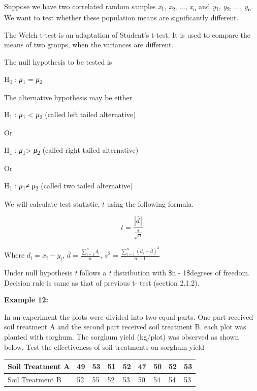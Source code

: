 \documentclass[
]{book}
\begin{document}
Suppose we have two correlated random samples \emph{x}\textsubscript{1}, \emph{x}\textsubscript{2}, ..., \emph{x}\textsubscript{n} and \emph{y}\textsubscript{1}, \emph{y}\textsubscript{2}, ..., \emph{y}\textsubscript{n}. We want to test whether these population means are significantly different.

The Welch t-test is an adaptation of Student's t-test. It is used to compare the means of two groups, when the variances are different.

The null hypothesis to be tested is

H\textsubscript{0} : \emph{μ}\textsubscript{1} = \emph{μ}\textsubscript{2}

The alternative hypothesis may be either

H\textsubscript{1} : \emph{μ}\textsubscript{1} \textless{} \emph{μ}\textsubscript{2} (called left tailed alternative)

Or

H\textsubscript{1} : \emph{μ}\textsubscript{1}\textgreater{} \emph{μ}\textsubscript{2} (called right tailed alternative)

Or

H\textsubscript{1} : \emph{μ}\textsubscript{1}≠ \emph{μ}\textsubscript{2} (called two tailed alternative)

We will calculate test statistic, \(t\) using the following formula.

\[t = \frac{|d^̅|}{\frac{s}{\sqrt{n}}}\]

Where \(d_{i} = x_{i} - y_{i}\), \(\overline{d} = \frac{\sum_{i = 1}^{n}d_{i}}{n}\), \(s^{2} = \frac{\sum_{i = 1}^{n}\left( d_{i} - \overline{d} \right)^{2}}{n - 1}\)

Under null hypothesis \emph{t} follows a \emph{t} distribution with \$n - 1\$degrees of freedom. Decision rule is same as that of previous t- test (section 2.1.2).

\textbf{Example 12:}

In an experiment the plots were divided into two equal parts. One part received soil treatment A and the second part received soil treatment B. each plot was planted with sorghum. The sorghum yield (kg/plot) was observed as shown below. Test the effectiveness of soil treatments on sorghum yield

\begin{longtable}[]{@{}lllllllll@{}}
\toprule\noalign{}
Soil Treatment A & 49 & 53 & 51 & 52 & 47 & 50 & 52 & 53 \\
\midrule\noalign{}
\endhead
\bottomrule\noalign{}
\endlastfoot
Soil Treatment B & 52 & 55 & 52 & 53 & 50 & 54 & 54 & 53 \\
\end{longtable}
\end{document}
